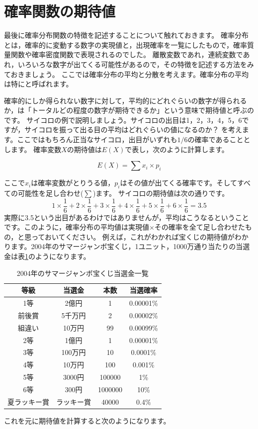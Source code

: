 \documentclass{ltjbook}
\begin{document}
\section{確率関数の期待値}
\label{expectation}
最後に確率分布関数の特徴を記述することについて触れておきます。
確率分布とは，確率的に変動する数字の実現値と，出現確率を一覧にしたもので，確率質量関数や確率密度関数で表現されるのでした。
離散変数であれ，連続変数であれ，いろいろな数字が出てくる可能性があるので，その特徴を記述する方法をみておきましょう。
ここでは確率分布の平均と分散を考えます。確率分布の平均は特にと呼ばれます。

確率的にしか得られない数字に対して，平均的にどれぐらいの数字が得られるか，は「トータルどの程度の数字が期待できるか」という意味で期待値と呼ぶのです。
サイコロの例で説明しましょう。サイコロの出目は1，2，3，4，5，6ですが，サイコロを振って出る目の平均はどれぐらいの値になるのか？ を考えます。ここではもちろん正当なサイコロ，出目がいずれも$1/6$の確率であることとします。
確率変数$X$の期待値は$E(X)$で表し，次のように計算します。

\[ E(X) = \sum x_i \times p_i \]

ここで$x_i$は確率変数がとりうる値，$p_i$はその値が出てくる確率です。そしてすべての可能性を足し合わせ($\sum$)ます。
サイコロの期待値は次の通りです。
\[1\times\frac{1}{6}+
2\times\frac{1}{6}+
3\times\frac{1}{6}+
4\times\frac{1}{6}+
5\times\frac{1}{6}+
6\times\frac{1}{6}
=3.5\]
実際に3.5という出目があるわけではありませんが，平均はこうなるということです。このように，確率分布の平均値は実現値$\times$その確率を全て足し合わせたもの，と思っておいてください。
例えば，これがわかれば宝くじの期待値がわかります。2004年のサマージャンボ宝くじ，1ユニット，1000万通り当たりの当選金は表\ref{takarakuji}のようになります。


\begin{table}[hb]
    \centering
    \caption{2004年のサマージャンボ宝くじ当選金一覧}
    \begin{tabular}{cccc}
等級 & 当選金 & 本数 & 当選確率 \\\hline
1等 & 2億円 & 1 & 0.00001\% \\
前後賞 & 5千万円 & 2 & 0.00002\% \\
組違い & 10万円 & 99 & 0.00099\% \\
2等 & 1億円 & 1 & 0.00001\% \\
3等 & 100万円 & 10 & 0.0001\% \\
4等 & 10万円 & 100 & 0.001\% \\
5等 & 3000円 & 100000 & 1\% \\
6等 & 300円 & 1000000 & 10\% \\
夏ラッキー賞 & ラッキー賞 & 40000 & 0.4\% \\
    \end{tabular}
    \label{takarakuji}
\end{table}
これを元に期待値を計算すると次のようになります。
\end{document}
